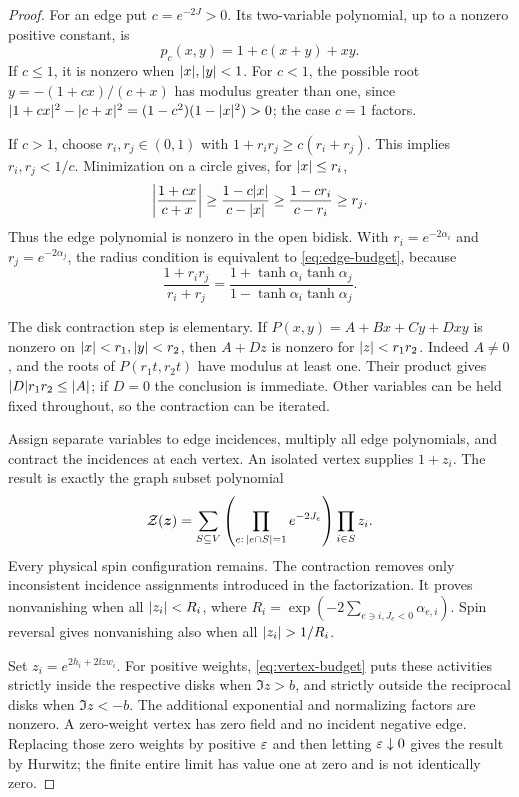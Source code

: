 \begin{proof}
For an edge put $c=e^{-2J}>0$. Its two-variable polynomial, up to a nonzero positive constant, is
\[
 p_c(x,y)=1+c(x+y)+xy.
\]
If $c\le1$, it is nonzero when $\lvert x\rvert,\lvert y\rvert<1$. For $c<1$, the possible root $y=-(1+cx)/(c+x)$ has modulus greater than one, since
$\lvert1+cx\rvert^2-\lvert c+x\rvert^2=(1-c^2)(1-\lvert x\rvert^2)>0$; the case $c=1$ factors.

If $c>1$, choose $r_i,r_j\in(0,1)$ with
$1+r_ir_j\ge c(r_i+r_j)$. This implies $r_i,r_j<1/c$. Minimization on a circle gives, for $\lvert x\rvert\le r_i$,
\[
 \left|\frac{1+cx}{c+x}\right|
 \ge\frac{1-c\lvert x\rvert}{c-\lvert x\rvert}
 \ge\frac{1-cr_i}{c-r_i}\ge r_j.
\]
Thus the edge polynomial is nonzero in the open bidisk. With $r_i=e^{-2\alpha_i}$ and $r_j=e^{-2\alpha_j}$, the radius condition is equivalent to \eqref{eq:edge-budget}, because
\[
 \frac{1+r_ir_j}{r_i+r_j}
 =\frac{1+\tanh\alpha_i\tanh\alpha_j}
        {1-\tanh\alpha_i\tanh\alpha_j}.
\]

The disk contraction step is elementary. If $P(x,y)=A+Bx+Cy+Dxy$ is nonzero on $\lvert x\rvert<r_1,\lvert y\rvert<r_2$, then $A+Dz$ is nonzero for $\lvert z\rvert<r_1r_2$. Indeed $A\ne0$, and the roots of $P(r_1t,r_2t)$ have modulus at least one. Their product gives $\lvert D\rvert r_1r_2\le\lvert A\rvert$; if $D=0$ the conclusion is immediate. Other variables can be held fixed throughout, so the contraction can be iterated.

Assign separate variables to edge incidences, multiply all edge polynomials, and contract the incidences at each vertex. An isolated vertex supplies $1+z_i$. The result is exactly the graph subset polynomial
\[
 \mathcal Z(\boldsymbol z)
 =\sum_{S\subseteq V}
  \left(\prod_{e:\,\lvert e\cap S\rvert=1}e^{-2J_e}\right)\prod_{i\in S}z_i.
\]
Every physical spin configuration remains. The contraction removes only inconsistent incidence assignments introduced in the factorization. It proves nonvanishing when all $\lvert z_i\rvert<R_i$, where
$R_i=\exp(-2\sum_{e\ni i,J_e<0}\alpha_{e,i})$. Spin reversal gives nonvanishing also when all $\lvert z_i\rvert>1/R_i$.

Set $z_i=e^{2h_i+2\ii zw_i}$. For positive weights, \eqref{eq:vertex-budget} puts these activities strictly inside the respective disks when $\Im z>b$, and strictly outside the reciprocal disks when $\Im z<-b$. The additional exponential and normalizing factors are nonzero. A zero-weight vertex has zero field and no incident negative edge. Replacing those zero weights by positive $\varepsilon$ and then letting $\varepsilon\downarrow0$ gives the result by Hurwitz; the finite entire limit has value one at zero and is not identically zero.
\end{proof}

